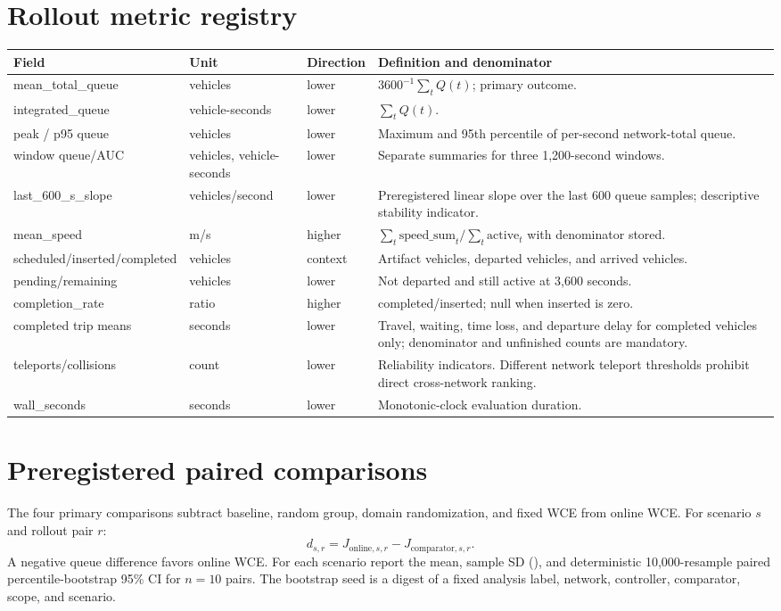 \section{Rollout metric registry}
\begin{longtable}{@{}p{}p{}p{}p{}@{}}
\toprule
Field & Unit & Direction & Definition and denominator \\
\midrule
mean\_total\_queue & vehicles & lower & $3600^{-1}\sum_tQ(t)$; primary outcome.\\
integrated\_queue & vehicle-seconds & lower & $\sum_tQ(t)$.\\
peak / p95 queue & vehicles & lower & Maximum and 95th percentile of per-second network-total queue.\\
window queue/AUC & vehicles, vehicle-seconds & lower & Separate summaries for three 1,200-second windows.\\
last\_600\_s\_slope & vehicles/second & lower & Preregistered linear slope over the last 600 queue samples; descriptive stability indicator.\\
mean\_speed & m/s & higher & $\sum_t\mathrm{speed\_sum}_t/\sum_t\mathrm{active}_t$ with denominator stored.\\
scheduled/inserted/completed & vehicles & context & Artifact vehicles, departed vehicles, and arrived vehicles.\\
pending/remaining & vehicles & lower & Not departed and still active at 3,600 seconds.\\
completion\_rate & ratio & higher & completed/inserted; null when inserted is zero.\\
completed trip means & seconds & lower & Travel, waiting, time loss, and departure delay for completed vehicles only; denominator and unfinished counts are mandatory.\\
teleports/collisions & count & lower & Reliability indicators. Different network teleport thresholds prohibit direct cross-network ranking.\\
wall\_seconds & seconds & lower & Monotonic-clock evaluation duration.\\
\bottomrule
\end{longtable}

\section{Preregistered paired comparisons}
The four primary comparisons subtract baseline, random group, domain randomization, and fixed WCE from online WCE. For scenario $s$ and rollout pair $r$:
\[
d_{s,r}=J_{\mathrm{online},s,r}-J_{\mathrm{comparator},s,r}.
\]
A negative queue difference favors online WCE. For each scenario report the mean, sample SD (), and deterministic 10,000-resample paired percentile-bootstrap 95\% CI for $n=10$ pairs. The bootstrap seed is a digest of a fixed analysis label, network, controller, comparator, scope, and scenario.

